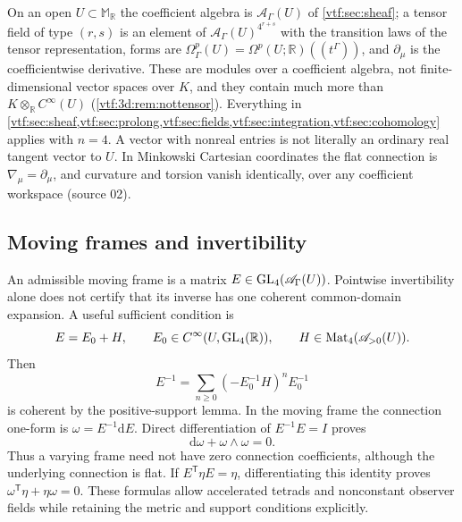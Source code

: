 \documentclass[11pt,letterpaper]{article}
\theoremstyle{definition}
\theoremstyle{remark}
\newcommand{\R}{\mathbb R}\newcommand{\C}{\mathbb C}
\newcommand{\A}{\mathscr A}\newcommand{\OO}{\mathcal O}\newcommand{\mm}{\mathfrak m}
\newcommand{\dd}{\mathrm d}
\newcommand{\M}{\mathbb M}
\begin{document}
On an open $U\subset\M_\R$ the coefficient algebra is $\A_\Gamma(U)$ of
\cref{vtf:sec:sheaf}; a tensor field of type $(r,s)$ is an element of
$\A_\Gamma(U)^{4^{r+s}}$ with the transition laws of the tensor representation,
forms are $\Omega^p_\Gamma(U)=\Omega^p(U;\R)((t^\Gamma))$, and $\partial_\mu$ is
the coefficientwise derivative. These are modules over a coefficient algebra,
not finite-dimensional vector spaces over $K$, and they contain much more than
$K\otimes_\R C^\infty(U)$ (\cref{vtf:3d:rem:nottensor}). Everything in
\cref{vtf:sec:sheaf,vtf:sec:prolong,vtf:sec:fields,vtf:sec:integration,vtf:sec:cohomology}
applies with $n=4$. A vector with nonreal entries is not literally an ordinary
real tangent vector to $U$. In Minkowski Cartesian coordinates the flat
connection is $\nabla_\mu=\partial_\mu$, and curvature and torsion vanish
identically, over any coefficient workspace (source 02).

\subsection{Moving frames and invertibility}
An admissible moving frame is a matrix $E\in\GL_4(\A_\Gamma(U))$. Pointwise invertibility alone does not certify that its inverse has one coherent common-domain expansion. A useful sufficient condition is
\begin{equation}
 E=E_0+H,\qquad E_0\in C^\infty(U,\GL_4(\R)),\qquad
 H\in\operatorname{Mat}_4(\A_{>0}(U)).
\end{equation}
Then
\begin{equation}
 E^{-1}=\sum_{n\geq0}(-E_0^{-1}H)^n E_0^{-1}
\end{equation}
is coherent by the positive-support lemma. In the moving frame the connection one-form is $\omega=E^{-1}\dd E$. Direct differentiation of $E^{-1}E=I$ proves
\begin{equation}
 \dd\omega+\omega\wedge\omega=0.
\end{equation}
Thus a varying frame need not have zero connection coefficients, although the underlying connection is flat. If $E^{\mathsf T}\eta E=\eta$, differentiating this identity proves $\omega^{\mathsf T}\eta+\eta\omega=0$. These formulas allow accelerated tetrads and nonconstant observer fields while retaining the metric and support conditions explicitly.
\end{document}

